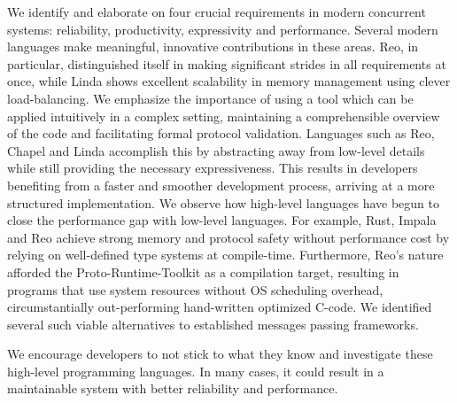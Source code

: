 We identify and elaborate on four crucial requirements in modern concurrent systems: reliability, productivity, expressivity and performance. Several modern languages make meaningful, innovative contributions in these areas. Reo, in particular, distinguished itself in making significant strides in all requirements at once, while Linda shows excellent scalability in memory management using clever load-balancing. We emphasize the importance of using a tool which can be applied intuitively in a complex setting, maintaining a comprehensible overview of the code and facilitating formal protocol validation. Languages such as Reo, Chapel and Linda accomplish this by abstracting away from low-level details while still providing the necessary expressiveness. This results in developers benefiting from a faster and smoother development process, arriving at a more structured implementation. We observe how high-level languages have begun to close the performance gap with low-level languages. For example, Rust, Impala and Reo achieve strong memory and protocol safety without performance cost by relying on well-defined type systems at compile-time. Furthermore, Reo's nature afforded the Proto-Runtime-Toolkit as a compilation target, resulting in programs that use system resources without OS scheduling overhead, circumstantially out-performing hand-written optimized C-code. We identified several such viable alternatives to established messages passing frameworks.

We encourage developers to not stick to what they know and investigate these high-level programming languages. In many cases, it could result in a maintainable system with better reliability and performance.

